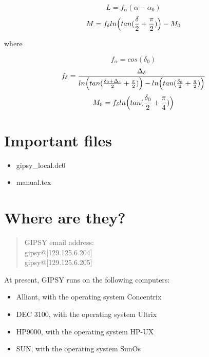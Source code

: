 $$L = f_\alpha (\alpha-\alpha_0)$$
$$M = f_\delta ln\Bigl(tan({{\delta}\over{2}} + {{\pi}\over{2}})\Bigr) - M_0$$

where

$$f_\alpha = cos(\delta_0)$$
$$f_\delta = {{\Delta_\delta}\over{ln\Bigl(tan({{\delta_0+\Delta_\delta}\over{2}}+{{\pi}\over{2}})\Bigr) - ln\Bigl(tan({{\delta_0}\over{2}} + {{\pi}\over{2}})\Bigr)}}$$
$$M_0 = f_\delta ln\Bigl(tan({{\delta_0}\over{2}} + {{\pi}\over{4}})\Bigr)$$



\section{Important files}

\begin{itemize}

\item gipsy\_local.dc0

\item manual.tex

\end{itemize}

\section{Where are they?}

\begin{verse}
GIPSY email address:\\
gipsy@[129.125.6.204]\\
gipsy@[129.125.6.205]\\
\end{verse}


\clearpage



At present, GIPSY runs on the following computers:

\begin{itemize}

\item Alliant, with the operating system Concentrix

\item DEC 3100, with the operating system Ultrix

\item HP9000, with the operating system HP-UX

\item SUN, with the operating system SunOs

\end{itemize}

